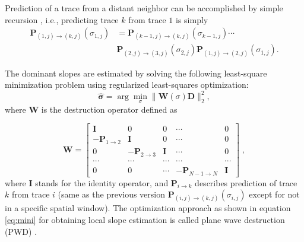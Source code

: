 Prediction of a trace from a distant neighbor can be accomplished by simple recursion \cite[]{liuyang2010}, i.e., predicting trace $k$ from trace $1$ is simply
\begin{equation}
\label{eq:recur}
\begin{split}
\mathbf{P}_{(1,j)\rightarrow(k,j)} (\sigma_{1,j})&= \mathbf{P}_{(k-1,j)\rightarrow(k,j)}(\sigma_{k-1,j})\cdots\\
&\mathbf{P}_{(2,j)\rightarrow(3,j)}(\sigma_{2,j})\mathbf{P}_{(1,j)\rightarrow(2,j)}(\sigma_{1,j}).
\end{split}
\end{equation}


The dominant slopes are estimated by solving the following least-square minimization problem using regularized least-squares optimization:
\begin{equation}
\label{eq:mini}
\hat{\mathbf{\sigma}} = \arg\min_{\sigma} \parallel \mathbf{W}(\sigma)\mathbf{D} \parallel_2^2,
\end{equation}
where $\mathbf{W}$ is the destruction operator defined as 

\begin{displaymath} 
\mathbf{W} = \left[
\begin{array}{ccccc} 
\mathbf{I} & 0 & 0 & \cdots & 0\\
-\mathcal{\mathbf{P}}_{1\rightarrow 2} &\mathbf{I} & 0 &\cdots &0\\
0 &-\mathcal{\mathbf{P}}_{2\rightarrow 3} & \mathbf{I} & \cdots & 0 \\
\cdots & \cdots & \cdots & \cdots & \cdots \\
0& 0 & \cdots & - \mathcal{\mathbf{P}}_{N-1\rightarrow N} & \mathbf{I}
\end{array}\right]\;, 
\end{displaymath}
where $\mathbf{I}$ stands for the identity operator, and $\mathcal{\mathbf{P}}_{i\rightarrow k}$ describes prediction of trace $k$ from trace $i$ (same as the previous version $\mathbf{P}_{(i,j)\rightarrow(k,j)}(\sigma_{i,j})$ except for not in a specific spatial window). The optimization approach as shown in equation \ref{eq:mini} for obtaining local slope estimation is called plane wave destruction (PWD) \cite[]{fomel2002pwd}.

